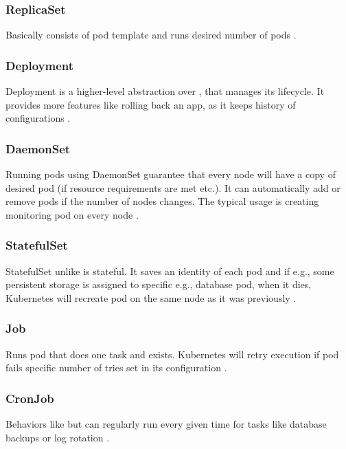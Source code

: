 \subsubsection{ReplicaSet}
\label{replicaset}

Basically \textit{} consists of pod template and runs desired number of pods \cite{KubernetesReplicaSet}. 


\subsubsection{Deployment}
\label{deployment}

Deployment is a higher-level abstraction over \textit{}, that manages its lifecycle. It provides more features like rolling back an app, as it keeps history of configurations \cite{KubernetesDeployments}.

\subsubsection{DaemonSet}
\label{daemonset}

Running pods using DaemonSet guarantee that every node will have a copy of desired pod (if resource requirements are met etc.). It can automatically add or remove pods if the number of nodes changes. The typical usage is creating monitoring pod on every node \cite{KubernetesDaemonSet}. 


\subsubsection{StatefulSet}
\label{statefulset}

StatefulSet unlike \textit{} is stateful. It saves an identity of each pod and if e.g., some persistent storage is assigned to specific e.g., database pod, when it dies, Kubernetes will recreate pod on the same node as it was previously \cite{KubernetesStatefulSet}.

\subsubsection{Job}
\label{job}

Runs pod that does one task and exists. Kubernetes will retry execution if pod fails specific number of tries set in its configuration \cite{KubernetesJobs}.

\subsubsection{CronJob}
\label{cronjob}
Behaviors like \textit{} but can regularly run every given time for tasks like database backups or log rotation \cite{KubernetesCronJob}. 

